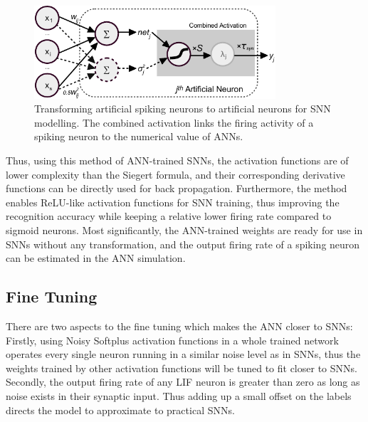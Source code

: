 	\begin{figure}[tbh!]
		\centering
		\includegraphics[width=0.8\textwidth]{pics_iconip/neuron_t.pdf}
		\caption{Transforming artificial spiking neurons to artificial neurons for SNN modelling. The combined activation links the firing activity of a spiking neuron to the numerical value of ANNs.}
		\label{Fig:tneuron}
	\end{figure}
	
	
	

	

	
	Thus, using this method of ANN-trained SNNs, the activation functions are of lower complexity than the Siegert formula, and their corresponding derivative functions can be directly used for back propagation.
	Furthermore, the method enables ReLU-like activation functions for SNN training, thus improving the recognition accuracy while keeping a relative lower firing rate compared to sigmoid neurons. 
	Most significantly, the ANN-trained weights are ready for use in SNNs without any transformation, and the output firing rate of a spiking neuron can be estimated in the ANN simulation.
	
	
	\subsection{Fine Tuning}
	There are two aspects to the fine tuning which makes the ANN closer to SNNs:
	Firstly, using Noisy Softplus activation functions in a whole trained network operates every single neuron running in a similar noise level as in SNNs, thus the weights trained by other activation functions will be tuned to fit closer to SNNs.
	Secondly, the output firing rate of any LIF neuron is greater than zero as long as noise exists in their synaptic input.
	Thus adding up a small offset on the labels directs the model to approximate to practical SNNs. 
	
